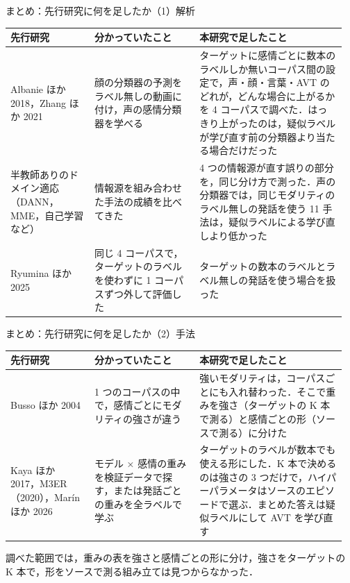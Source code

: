 \begin{frame}{まとめ：先行研究に何を足したか（1）解析}
\footnotesize
{\centering
\begin{tabular}{@{}p{0.24\linewidth}p{0.30\linewidth}p{0.42\linewidth}@{}}
\toprule
先行研究 & 分かっていたこと & 本研究で足したこと \\
\midrule
Albanie ほか 2018，Zhang ほか 2021 & 顔の分類器の予測をラベル無しの動画に付け，声の感情分類器を学べる & ターゲットに感情ごとに数本のラベルしか無いコーパス間の設定で，声・顔・言葉・AVT のどれが，どんな場合に上がるかを 4 コーパスで調べた．はっきり上がったのは，疑似ラベルが学び直す前の分類器より当たる場合だけだった \\
\addlinespace[2pt]
半教師ありのドメイン適応（DANN，MME，自己学習など） & 情報源を組み合わせた手法の成績を比べてきた & 4 つの情報源が直す誤りの部分を，同じ分け方で測った．声の分類器では，同じモダリティのラベル無しの発話を使う 11 手法は，疑似ラベルによる学び直しより低かった \\
\addlinespace[2pt]
Ryumina ほか 2025 & 同じ 4 コーパスで，ターゲットのラベルを使わずに 1 コーパスずつ外して評価した & ターゲットの数本のラベルとラベル無しの発話を使う場合を扱った \\
\bottomrule
\end{tabular}\par}
\end{frame}

\begin{frame}{まとめ：先行研究に何を足したか（2）手法}
\footnotesize
{\centering
\begin{tabular}{@{}p{0.24\linewidth}p{0.30\linewidth}p{0.42\linewidth}@{}}
\toprule
先行研究 & 分かっていたこと & 本研究で足したこと \\
\midrule
Busso ほか 2004 & 1 つのコーパスの中で，感情ごとにモダリティの強さが違う & 強いモダリティは，コーパスごとにも入れ替わった．そこで重みを強さ（ターゲットの K 本で測る）と感情ごとの形（ソースで測る）に分けた \\
\addlinespace[2pt]
Kaya ほか 2017，M3ER（2020），Marín ほか 2026 & モデル × 感情の重みを検証データで探す，または発話ごとの重みを全ラベルで学ぶ & ターゲットのラベルが数本でも使える形にした．K 本で決めるのは強さの 3 つだけで，ハイパーパラメータはソースのエピソードで選ぶ．まとめた答えは疑似ラベルにして AVT を学び直す \\
\bottomrule
\end{tabular}\par}
\medskip
調べた範囲では，重みの表を強さと感情ごとの形に分け，強さをターゲットの K 本で，形をソースで測る組み立ては見つからなかった．
\end{frame}

